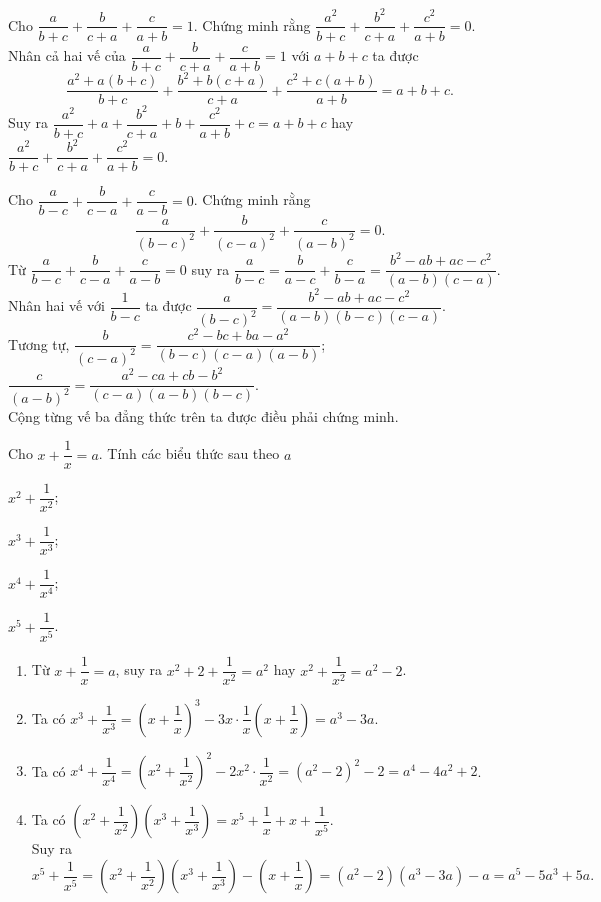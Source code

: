 \begin{bt}%
 Cho $\dfrac{a}{b+c}+\dfrac{b}{c+a}+\dfrac{c}{a+b}=1$. Chứng minh rằng $\dfrac{a^2}{b+c}+\dfrac{b^2}{c+a}+\dfrac{c^2}{a+b}=0$.
 \loigiai
  {
  Nhân cả hai vế của $\dfrac{a}{b+c}+\dfrac{b}{c+a}+\dfrac{c}{a+b}=1$ với $a+b+c$ ta được
  \[\dfrac{a^2+a(b+c)}{b+c} + \dfrac{b^2+b(c+a)}{c+a} + \dfrac{c^2+c(a+b)}{a+b} = a+b+c. \]
  Suy ra $\dfrac{a^2}{b+c}+a + \dfrac{b^2}{c+a}+b + \dfrac{c^2}{a+b}+c =a+b+c$ hay $\dfrac{a^2}{b+c}+\dfrac{b^2}{c+a}+\dfrac{c^2}{a+b}=0$.
  }
\end{bt}

\begin{bt}%
 Cho $\dfrac{a}{b-c}+\dfrac{b}{c-a}+\dfrac{c}{a-b}=0$. Chứng minh rằng $$ \dfrac{a}{(b-c)^2}+\dfrac{b}{(c-a)^2}+\dfrac{c}{(a-b)^2}=0.$$
 \loigiai
  {
  Từ $\dfrac{a}{b-c}+\dfrac{b}{c-a}+\dfrac{c}{a-b}=0$ suy ra $\dfrac{a}{b-c}=\dfrac{b}{a-c}+\dfrac{c}{b-a}=\dfrac{b^2-ab+ac-c^2}{(a-b)(c-a)}$.\\
  Nhân hai vế với $\dfrac{1}{b-c}$ ta được $\dfrac{a}{(b-c)^2} = \dfrac{b^2-ab+ac-c^2}{(a-b)(b-c)(c-a)}$.\\
  Tương tự, $\dfrac{b}{(c-a)^2}=\dfrac{c^2-bc+ba-a^2}{(b-c)(c-a)(a-b)}$; $\dfrac{c}{(a-b)^2}=\dfrac{a^2-ca+cb-b^2}{(c-a)(a-b)(b-c)}$.\\
  Cộng từng vế ba đẳng thức trên ta được điều phải chứng minh.
  }
\end{bt}

\begin{bt}%
 Cho $x+\dfrac{1}{x}=a$. Tính các biểu thức sau theo $a$ 
 \begin{enumEX}{4}
  \item $x^2+\dfrac{1}{x^2}$;
  \item $x^3+\dfrac{1}{x^3}$;
  \item $x^4+\dfrac{1}{x^4}$;
  \item $x^5+\dfrac{1}{x^5}$.
 \end{enumEX}
 \loigiai
  {
  \begin{enumerate}
   \item Từ $x+\dfrac{1}{x}=a$, suy ra $x^2+2+\dfrac{1}{x^2}=a^2$ hay $x^2+\dfrac{1}{x^2}=a^2-2$.
   \item Ta có $x^3+\dfrac{1}{x^3} = \left(x+\dfrac{1}{x}\right)^3-3x\cdot \dfrac{1}{x}\left(x+\dfrac{1}{x}\right) = a^3-3a$.
   \item Ta có $x^4+\dfrac{1}{x^4}=\left(x^2+\dfrac{1}{x^2}\right)^2-2x^2 \cdot \dfrac{1}{x^2} = (a^2-2)^2-2 = a^4-4a^2+2$.
   \item Ta có $\left(x^2+\dfrac{1}{x^2}\right)\left(x^3+\dfrac{1}{x^3}\right) = x^5+\dfrac{1}{x}+x+\dfrac{1}{x^5}$.\\
   Suy ra $$x^5+\dfrac{1}{x^5} = \left(x^2+\dfrac{1}{x^2}\right)\left(x^3+\dfrac{1}{x^3}\right) - \left(x+\dfrac{1}{x}\right) = (a^2-2)(a^3-3a)-a = a^5-5a^3+5a.$$
  \end{enumerate}
  }
\end{bt}

